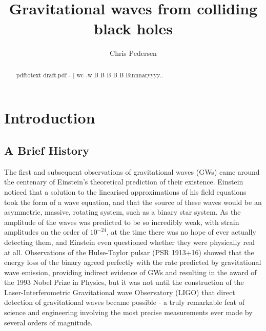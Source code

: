 \documentclass[]{article}
\title{Gravitational waves from colliding black holes}
\author{Chris Pedersen}
\begin{document}
\maketitle

\begin{abstract}pdftotext draft.pdf - | wc -w
B B B B B Binnnaryyyy.. 

\end{abstract}

\section{Introduction}
\subsection{A Brief History}
The first\cite{obs} and subsequent\cite{obs2} observations of gravitational waves (GWs) came around the centenary of Einstein's theoretical prediction of their existence\cite{eins1}\cite{eins2}. Einstein noticed that a solution to the linearised approximations of his field equations took the form of a wave equation\cite{gw1}, and that the source of these waves would be an asymmetric, massive, rotating system, such as a binary star system. As the amplitude of the waves was predicted to be so incredibly weak, with strain amplitudes on the order of $10^{-24}$, at the time there was no hope of ever actually detecting them, and Einstein even questioned whether they were physically real at all\cite{eins3}. Observations of the Hulse-Taylor pulsar (PSR 1913+16)\cite{hulse} showed that the energy loss of the binary agreed perfectly with the rate predicted by gravitational wave emission, providing indirect evidence of GWs and resulting in the award of the 1993 Nobel Prize in Physics, but it was not until the construction of the Laser-Interferometric Gravitational wave Observatory (LIGO) that direct detection of gravitational waves became possible - a truly remarkable feat of science and engineering involving the most precise measurements ever made by several orders of magnitude.
\end{document}
